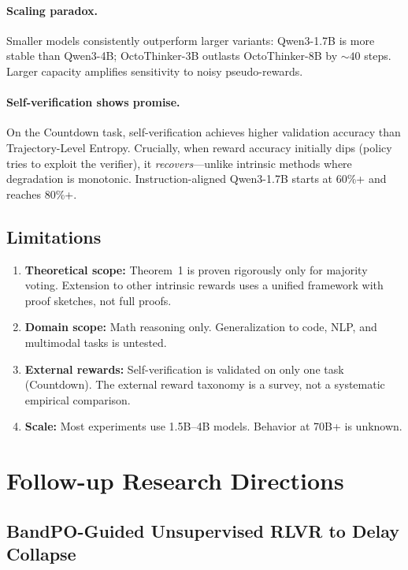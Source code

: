\documentclass[11pt]{article}
\begin{document}
\paragraph{Scaling paradox.} Smaller models consistently outperform larger variants: Qwen3-1.7B is more stable than Qwen3-4B; OctoThinker-3B outlasts OctoThinker-8B by ${\sim}40$ steps. Larger capacity amplifies sensitivity to noisy pseudo-rewards.

\paragraph{Self-verification shows promise.} On the Countdown task, self-verification achieves higher validation accuracy than Trajectory-Level Entropy. Crucially, when reward accuracy initially dips (policy tries to exploit the verifier), it \emph{recovers}---unlike intrinsic methods where degradation is monotonic. Instruction-aligned Qwen3-1.7B starts at 60\%+ and reaches 80\%+.

\subsection{Limitations}

\begin{enumerate}
    \item \textbf{Theoretical scope:} Theorem~1 is proven rigorously only for majority voting. Extension to other intrinsic rewards uses a unified framework with proof sketches, not full proofs.
    \item \textbf{Domain scope:} Math reasoning only. Generalization to code, NLP, and multimodal tasks is untested.
    \item \textbf{External rewards:} Self-verification is validated on only one task (Countdown). The external reward taxonomy is a survey, not a systematic empirical comparison.
    \item \textbf{Scale:} Most experiments use 1.5B--4B models. Behavior at 70B+ is unknown.
\end{enumerate}

\section{Follow-up Research Directions}

\subsection{BandPO-Guided Unsupervised RLVR to Delay Collapse}
\end{document}
